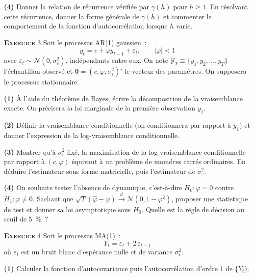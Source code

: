 \documentclass[10pt,a4paper,notitlepage,twocolumn]{article}
\newcommand{\exercice}[1]{\textsc{\textbf{Exercice}} #1}
\newcommand{\question}[1]{\textbf{(#1)}}
\begin{document}
\question{4} Donner la relation de récurrence vérifiée par $\gamma(h)$
pour $h\geq 1$. En résolvant cette récurrence, donner la forme générale
de $\gamma(h)$ et commenter le comportement de la fonction
d'autocorrélation lorsque $h$ varie.\newline

\bigskip

\exercice{3} Soit le processus AR(1) gaussien~:
\[
  y_t = c + \varphi y_{t-1} + \varepsilon_t,\qquad |\varphi|<1
\]
avec $\varepsilon_t \sim \mathcal{N}(0,\sigma_{\varepsilon}^2)$,
indépendants entre eux. On note $\mathcal Y_T \equiv
\{y_1,y_2,\dots,y_T\}$ l'échantillon observé et
$\bm{\theta}=(c,\varphi,\sigma_{\varepsilon}^2)'$ le vecteur des
paramètres. On supposera le processus stationnaire.\newline

\question{1} À l'aide du théorème de Bayes, écrire la décomposition de
la vraisemblance exacte. On précisera la loi marginale de la première
observation $y_1$.\newline

\question{2} Définir la vraisemblance conditionnelle (on conditionnera
par rapport à $y_1$) et donner l'expression de la log-vraisemblance
conditionnelle.\newline

\question{3} Montrer qu'à $\sigma_{\varepsilon}^2$ fixé, la
maximisation de la log-vraisemblance conditionnelle par rapport à
$(c,\varphi)$ équivaut à un problème de moindres carrés ordinaires. En
déduire l'estimateur sous forme matricielle, puis l'estimateur de
$\sigma_{\varepsilon}^2$.\newline

\question{4} On souhaite tester l'absence de dynamique, c'est-à-dire
$H_0:\varphi=0$ contre $H_1:\varphi\neq 0$. Sachant que
$\sqrt{T}(\hat\varphi-\varphi)\xrightarrow{d}\mathcal
N(0,1-\varphi^2)$, proposer une statistique de test et donner sa loi
asymptotique sous $H_0$. Quelle est la règle de décision au seuil de
5~\%~?\newline

\bigskip

\exercice{4} Soit le processus MA(1)~:
\[
  Y_t = \varepsilon_t + 2\,\varepsilon_{t-1}
\]
où $\varepsilon_t$ est un bruit blanc d'espérance nulle et de variance
$\sigma_{\varepsilon}^2$.\newline

\question{1} Calculer la fonction d'autocovariance puis
l'autocorrélation d'ordre 1 de $\{Y_t\}$.\newline
\end{document}

